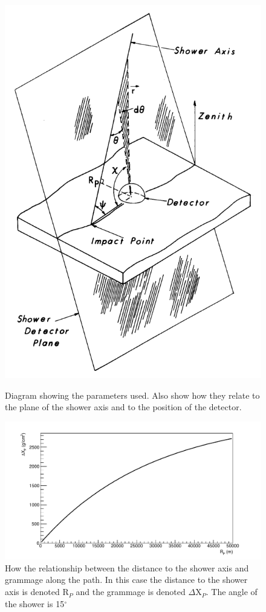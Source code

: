 \begin{figure}
\centering
\includegraphics[height=0.45\textheight]{chapters/pix/SelEff/ShowerPlane_and_Detector.png}
\caption{Diagram showing the parameters used. Also show how they relate to the plane of the shower axis and to the position of the detector.} \label{fig:ShowerPlaneAndAxis}
\vspace{3mm}
\includegraphics[width=\textwidth]{chapters/graphs/SelectionEff/XpVsRp.pdf}
\caption{How the relationship between the distance to the shower axis and grammage along the path. In this case the distance to the shower axis is denoted R$_P$ and the grammage is denoted $\Delta$X$_P$. The angle of the shower is 15$^{\circ}$} \label{fig:XpVsRp}
\end{figure}


